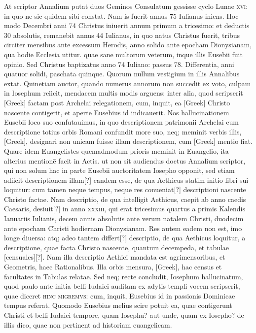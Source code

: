 \begin{parnumbers}
{}
At scriptor Annalium putat duos Geminos
Consulatum gessisse cyclo Lunae \textsc{xvi}: in quo ne sic quidem
sibi constat.
\lnr{}Nam is fuerit annus 75 Iulianus iniens.
\lnr{}Hoc modo Decembri anni 74 Christus iniuerit annum primum a tricesimo: et
deductis 30 absolutis, remanebit annus 44 Iulianus, in quo natus
Christus fuerit, tribus circiter mensibus ante excessum Herodis, anno
solido ante epocham Dionysianam, qua hodie Ecclesia utitur.
\lnr{}quae sane multorum veterum, inque illis Eusebii fuit opinio.
\lnr{}Sed
Christus baptizatus anno 74 Iuliano: passus 78.
\lnr{}Differentia, anni
quatuor solidi, paschata quinque.
\lnr{}Quorum nullum vestigium in illis
Annalibus extat.
\lnr{}Quinetiam auctor, quando numerus annorum
non succedit ex voto, culpam in Iosephum reiicit, mendacem multis
modis arguens: inter alia, quod scripserit \textgreek{[Greek]} factam post
Archelai relegationem, cum, inquit, ea \textgreek{[Greek]} Christo nascente
contigerit, et aperte Eusebius id indicauerit.
\lnr{}Nos hallucinationem
Eusebii loco suo confutauimus, in quo descriptionem patrimonii
Archelai cum descriptione totius orbis Romani confundit more
suo, neq; meminit verbis illis, \textgreek{[Greek]}, designari non
unicam fuisse illam descriptionem, cum \textgreek{[Greek]} mentio fiat.
\lnr{}Quare
idem Euangelistes quemadmodum prioris meminit in Euangelio,
ita alterius mentionē facit in Actis.
\lnr{}ut non sit audiendus doctus Annalium
scriptor, qui non solum hac in parte Eusebii auctoritatem
Iosepho opponit, sed etiam adiicit descriptionem illam[?] eandem esse,
de qua Aethicus statim initio libri sui loquitur: cum tamen neque
tempus, neque res conueniat[?] descriptioni nascente Christo factae.
\lnr{}Nam descriptio, de qua intelligit Aethicus, caepit ab anno caedis
Caesaris, desiuit[?] in anno \textsc{xxxiii},
 qui erat tricesimus quartus a primis
Kalendis Ianuariis Iulianis, decem annis absolutis ante verum
natalem Christi, duodecim ante epocham Christi hodiernam Dionysianam.
\lnr{}Res autem eadem non est, imo longe diuersa: atq; adeo
tantem differt[?] descriptio, de qua Aethicus loquitur, a descriptione,
quae facta Christo nascente, quantum decempeda, et tabulae [censuales][?].
\lnr{}Nam illa descriptio Aethici mandata est agrimensoribus, et
Geometris, haec Rationalibus.
\lnr{}Illa orbis mensura, \textgreek{[Greek]},
hac census et facultates in Tabulas relatae.
\lnr{}Sed neq; recte concludit,
Iosephum hallucinatum, quod paulo ante initia belli Iudaici
auditam ex adytis templi vocem scripserit, quae diceret \textsc{hinc
migremvs}: cum, inquit, Eusebius id in passionis Dominicae tempus
referat.
\lnr{}Quomodo Eusebius melius scire potuit ea, quae contigerunt
Christi et belli Iudaici tempore, quam Iosephu? aut unde,
quam ex Iosepho? de illis dico, quae non pertinent ad historiam euangelicam.




\end{parnumbers}
